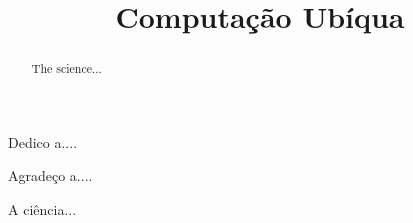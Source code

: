 \documentclass[bacharelado]{unb-cic}
\title{Computação Ubíqua}
\begin{document}
\maketitle

\pretextual
\begin{dedicatoria}
	Dedico a....
\end{dedicatoria}

\begin{agradecimentos}
	Agradeço a....
\end{agradecimentos}

\begin{resumo}
	A ciência...
\end{resumo}


\begin{abstract}
	The science...
\end{abstract}

\tableofcontents
\listoffigures
\listoftables

\textual



\postextual




\end{document}
